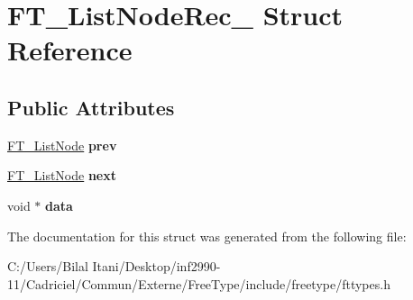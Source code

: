 \hypertarget{struct_f_t___list_node_rec__}{}\section{F\+T\+\_\+\+List\+Node\+Rec\+\_\+ Struct Reference}
\label{struct_f_t___list_node_rec__}
\subsection*{Public Attributes}
\begin{DoxyCompactItemize}
\item 
\hyperlink{struct_f_t___list_node_rec__}{F\+T\+\_\+\+List\+Node} {\bfseries prev}\hypertarget{struct_f_t___list_node_rec___a41c77950e6940b1b98e04709b705c046}{}\label{struct_f_t___list_node_rec___a41c77950e6940b1b98e04709b705c046}

\item 
\hyperlink{struct_f_t___list_node_rec__}{F\+T\+\_\+\+List\+Node} {\bfseries next}\hypertarget{struct_f_t___list_node_rec___a8275962fa8c92b77435cb4fa76251f39}{}\label{struct_f_t___list_node_rec___a8275962fa8c92b77435cb4fa76251f39}

\item 
void $\ast$ {\bfseries data}\hypertarget{struct_f_t___list_node_rec___ab0202be88f722442a4bec9aeb5f6418f}{}\label{struct_f_t___list_node_rec___ab0202be88f722442a4bec9aeb5f6418f}

\end{DoxyCompactItemize}


The documentation for this struct was generated from the following file\+:\begin{DoxyCompactItemize}
\item 
C\+:/\+Users/\+Bilal Itani/\+Desktop/inf2990-\/11/\+Cadriciel/\+Commun/\+Externe/\+Free\+Type/include/freetype/fttypes.\+h\end{DoxyCompactItemize}
